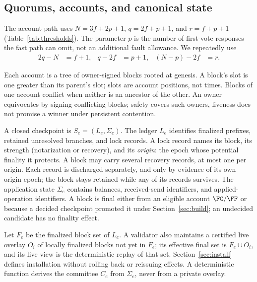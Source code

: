 \subsection{Quorums, accounts, and canonical state}
The account path uses $N=3f+2p+1$, $q=2f+p+1$, and $r=f+p+1$ (Table~\ref{tab:thresholds}). The parameter $p$ is the number of first-vote responses the fast path can omit, not an additional fault allowance. We repeatedly use
\begin{align}
2q-N&=f+1, & q-2f&=p+1, & (N-p)-2f&=r.\label{eq:intersect}
\end{align}

Each account is a tree of owner-signed blocks rooted at genesis. A block's slot is one greater than its parent's slot; slots are account positions, not times. Blocks of one account conflict when neither is an ancestor of the other. An owner equivocates by signing conflicting blocks; safety covers such owners, liveness does not promise a winner under persistent contention.

A closed checkpoint is $S_e=(L_e,\Sigma_e)$. The ledger $L_e$ identifies finalized prefixes, retained unresolved branches, and lock records. A lock record names its block, its strength (notarization or recovery), and its \emph{origin}: the epoch whose potential finality it protects. A block may carry several recovery records, at most one per origin. Each record is discharged separately, and only by evidence of its own origin epoch; the block stays retained while any of its records survives. The application state $\Sigma_e$ contains balances, received-send identifiers, and applied-operation identifiers. A block is final either from an eligible account $\FC/\FF$ or because a decided checkpoint promoted it under Section~\ref{sec:build}; an undecided candidate has no finality effect.

Let $F_e$ be the finalized block set of $L_e$. A validator also maintains a certified live overlay $O_i$ of locally finalized blocks not yet in $F_e$; its effective final set is $F_e\cup O_i$, and its live view is the deterministic replay of that set. Section~\ref{sec:install} defines installation without rolling back or reissuing effects. A deterministic function derives the committee $C_e$ from $\Sigma_e$, never from a private overlay.

